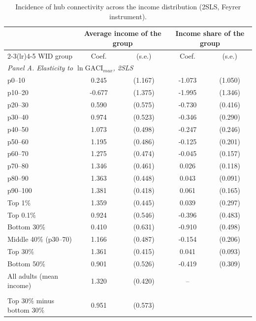 \begin{table}[p]
\centering
\caption{Incidence of hub connectivity across the income distribution (2SLS, Feyrer instrument).}
\label{tab:incidence}
\begin{threeparttable}
\small
\begin{tabular}{lcccc}
\toprule
 & \multicolumn{2}{c}{Average income of the group} & \multicolumn{2}{c}{Income share of the group} \\
\cmidrule(lr){2-3}\cmidrule(lr){4-5}
WID group & Coef. & (s.e.) & Coef. & (s.e.) \\
\midrule
\multicolumn{5}{l}{\emph{Panel A. Elasticity to $\ln\mathrm{GACI}_{max}$, 2SLS}}\\
p0--10 & 0.245 & (1.167) & -1.073 & (1.050) \\
p10--20 & -0.677 & (1.375) & -1.995 & (1.346) \\
p20--30 & 0.590 & (0.575) & -0.730\sym{*} & (0.416) \\
p30--40 & 0.974\sym{*} & (0.523) & -0.346 & (0.290) \\
p40--50 & 1.073\sym{**} & (0.498) & -0.247 & (0.246) \\
p50--60 & 1.195\sym{**} & (0.486) & -0.125 & (0.201) \\
p60--70 & 1.275\sym{***} & (0.474) & -0.045 & (0.157) \\
p70--80 & 1.346\sym{***} & (0.461) & 0.026 & (0.118) \\
p80--90 & 1.363\sym{***} & (0.448) & 0.043 & (0.091) \\
p90--100 & 1.381\sym{***} & (0.418) & 0.061 & (0.165) \\
Top 1\% & 1.359\sym{***} & (0.445) & 0.039 & (0.297) \\
Top 0.1\% & 0.924\sym{*} & (0.546) & -0.396 & (0.483) \\
Bottom 30\% & 0.410 & (0.631) & -0.910\sym{*} & (0.498) \\
Middle 40\% (p30--70) & 1.166\sym{**} & (0.487) & -0.154 & (0.206) \\
Top 30\% & 1.361\sym{***} & (0.415) & 0.041 & (0.093) \\
Bottom 50\% & 0.901\sym{*} & (0.526) & -0.419 & (0.309) \\
All adults (mean income) & 1.320\sym{***} & (0.420) & -- &  \\
\addlinespace
\multicolumn{5}{l}{\emph{Panel B. Differences between groups (difference outcomes)}}\\
Top 30\% minus bottom 30\% & 0.951\sym{*} & (0.573) & & \\

\end{tabular}
\end{threeparttable}
\end{table}
